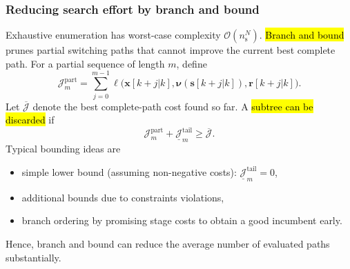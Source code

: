 \begin{frame}
	\frametitle{Reducing search effort by branch and bound}
	Exhaustive enumeration has worst-case complexity $\mathcal{O}(n_{\mathrm{s}}^{N})$. \pause%
	\hl{Branch and bound} prunes partial switching paths that cannot improve the current best complete path.
	For a partial sequence of length $m$, define
	\begin{equation}
		\mathcal{J}_{m}^{\mathrm{part}}
		=\sum_{j=0}^{m-1}\ell\bigl(\bm{x}[k+j|k],\bm{\nu}(\bm{s}[k+j|k]),\bm{r}[k+j|k]\bigr).
	\end{equation}\pause%
	Let $\overline{\mathcal{J}}$ denote the best complete-path cost found so far. A \hl{subtree can be discarded} if
	\begin{equation}
		\boxed{\mathcal{J}_{m}^{\mathrm{part}}+\underline{\mathcal{J}}_{m}^{\mathrm{tail}}\geq \overline{\mathcal{J}}.}
	\end{equation}\pause%
	Typical bounding ideas are
	\begin{itemize}
		\item simple lower bound (assuming non-negative costs): $\underline{\mathcal{J}}_{m}^{\mathrm{tail}}=0$,\pause%
		\item additional bounds due to constraints violations,\pause%
		\item branch ordering by promising stage costs to obtain a good incumbent early.\pause%
	\end{itemize}
	Hence, branch and bound can reduce the average number of evaluated paths substantially.
\end{frame}

